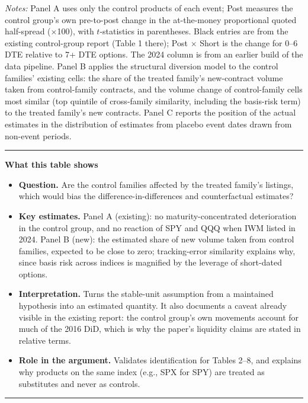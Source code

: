 \documentclass[11pt]{article}
\newenvironment{tableshows}
  {\begin{center}\begin{minipage}{0.95\textwidth}\small
   \hrule\vspace{4pt}
   \textbf{What this table shows}\par
   \begin{itemize}[leftmargin=12pt,topsep=4pt,itemsep=4pt,parsep=0pt]}
  {\end{itemize}\vspace{2pt}\hrule\end{minipage}\end{center}}
\begin{document}
\begin{table}[H]
\begin{threeparttable}
\begin{tablenotes}
\item[] \textit{Notes:} Panel A uses only the control products of each event; Post measures the control group's own pre-to-post change in the at-the-money proportional quoted half-spread ($\times$100), with $t$-statistics in parentheses. Black entries are from the existing control-group report (Table 1 there); Post $\times$ Short is the change for 0--6 DTE relative to 7+ DTE options. The 2024 column is from an earlier build of the data pipeline. Panel B applies the structural diversion model to the control families' existing cells: the share of the treated family's new-contract volume taken from control-family contracts, and the volume change of control-family cells most similar (top quintile of cross-family similarity, including the basis-risk term) to the treated family's new contracts. Panel C reports the position of the actual estimates in the distribution of estimates from placebo event dates drawn from non-event periods.
\end{tablenotes}
\end{threeparttable}
\end{table}

\begin{tableshows}
\item \textbf{Question.} Are the control families affected by the treated family's listings, which would bias the difference-in-differences and counterfactual estimates?
\item \textbf{Key estimates.} Panel A (existing): no maturity-concentrated deterioration in the control group, and no reaction of SPY and QQQ when IWM listed in 2024. Panel B (new): the estimated share of new volume taken from control families, expected to be close to zero; tracking-error similarity explains why, since basis risk across indices is magnified by the leverage of short-dated options.
\item \textbf{Interpretation.} Turns the stable-unit assumption from a maintained hypothesis into an estimated quantity. It also documents a caveat already visible in the existing report: the control group's own movements account for much of the 2016 DiD, which is why the paper's liquidity claims are stated in relative terms.
\item \textbf{Role in the argument.} Validates identification for Tables 2--8, and explains why products on the same index (e.g., SPX for SPY) are treated as substitutes and never as controls.
\end{tableshows}
\end{document}
